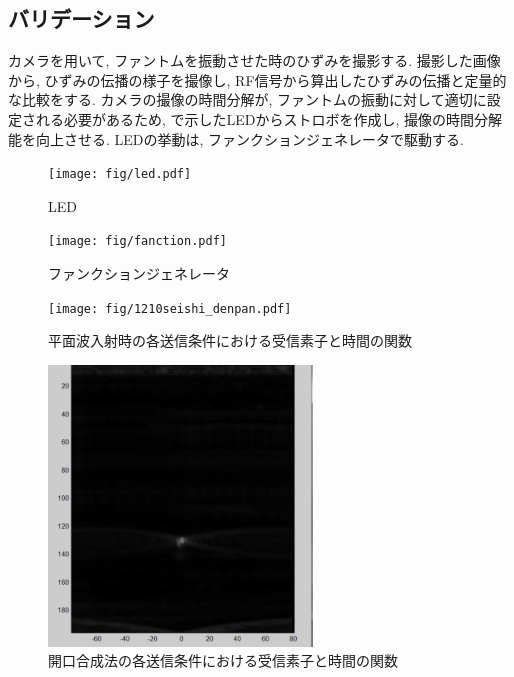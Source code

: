 \subsection{バリデーション}
カメラを用いて, ファントムを振動させた時のひずみを撮影する. 撮影した画像から, ひずみの伝播の様子を撮像し, RF信号から算出したひずみの伝播と定量的な比較をする. カメラの撮像の時間分解が, ファントムの振動に対して適切に設定される必要があるため, で示したLEDからストロボを作成し, 撮像の時間分解能を向上させる. LEDの挙動は, ファンクションジェネレータで駆動する. 
\begin{figure}[H]
 \begin{minipage}{0.5\hsize}
  \begin{center}
   \texttt{[image: fig/led.pdf]}
  \end{center}
  \caption{LED}
 \end{minipage}
 \begin{minipage}{0.5\hsize}
 \begin{center}
  \texttt{[image: fig/fanction.pdf]}
 \end{center}
  \caption{ファンクションジェネレータ }
 \end{minipage}
\end{figure}
\begin{figure}[H]
  \begin{center}
    \texttt{[image: fig/1210seishi\_denpan.pdf]}
  \end{center}
  \caption{平面波入射時の各送信条件における受信素子と時間の関数}
\end{figure}
\begin{figure}[H]
  \begin{center}
    \includegraphics[width=70mm]{fig/1210seishi_echo.pdf}
  \end{center}
  \caption{開口合成法の各送信条件における受信素子と時間の関数}
\end{figure}
